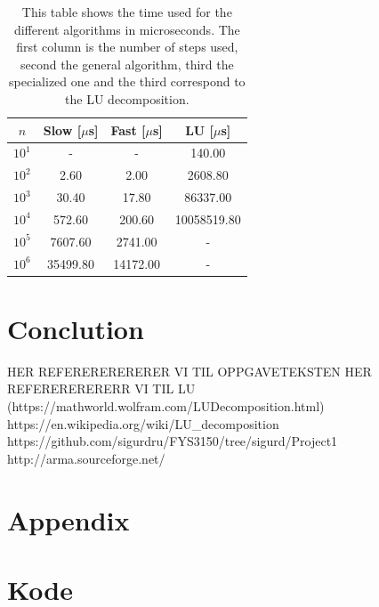 \documentclass[reprint, english,notitlepage]{revtex4-1}  %
\begin{document}
\begin{table}  %
		\begin{tabular}{||c | c | c | c||}
			\hline
			$n$ & Slow [$\mu$s] & Fast [$\mu$s] & LU [$\mu$s]    \\ \hline
			$10^{1}$ & - & - & 140.00    \\ \hline
			$10^{2}$ & 2.60 & 2.00 & 2608.80    \\ \hline
			$10^{3}$ & 30.40 & 17.80 & 86337.00    \\ \hline
			$10^{4}$ & 572.60 & 200.60 & 10058519.80    \\ \hline
			$10^{5}$ & 7607.60 & 2741.00 & -    \\ \hline
			$10^{6}$ & 35499.80 & 14172.00 & -    \\ \hline
		\end{tabular}
	\caption{This table shows the time used for the different algorithms in microseconds. The first column is the number of steps used, second the general algorithm, third the specialized one and the third correspond to the LU decomposition.}
	\label{tab:time}
\end{table}

\section{Conclution}

\onecolumngrid
\vspace{1cm} %
\newpage
\begin{thebibliography}{}
 HER REFERERERERERER VI TIL OPPGAVETEKSTEN
 HER REFERERERERERR VI TIL LU (https://mathworld.wolfram.com/LUDecomposition.html)
 https://en.wikipedia.org/wiki/LU\_decomposition
 https://github.com/sigurdru/FYS3150/tree/sigurd/Project1
 http://arma.sourceforge.net/
\end{thebibliography}

\section{Appendix}


\section{Kode}

% 
%
% 
\end{document}
